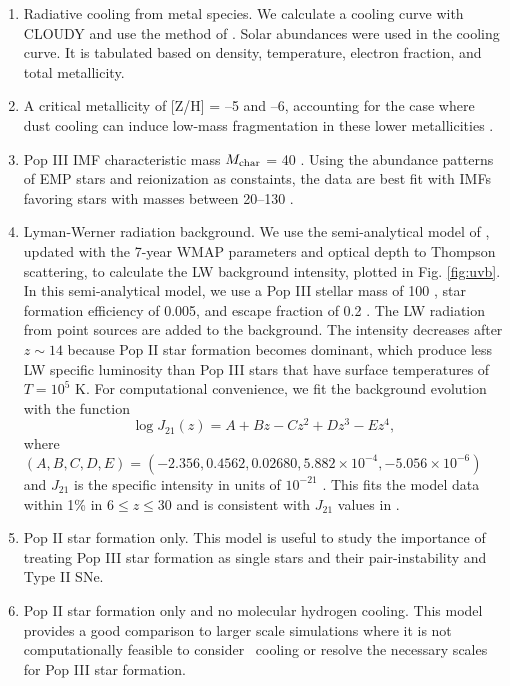 \documentclass[useAMS,usenatbib]{mn2e}
\begin{document}
\begin{enumerate}
\item Radiative cooling from metal species.  We calculate a cooling
  curve with CLOUDY \citep{CLOUDY} and use the method of
  \citep{2008MNRAS.385.1443S}.  Solar abundances were used in the
  cooling curve.  It is tabulated based on density, temperature,
  electron fraction, and total metallicity.
\item A critical metallicity of [Z/H] = --5 and --6, accounting for
  the case where dust cooling can induce low-mass fragmentation in
  these lower metallicities \citep{Omukai05, Schneider06_Frag}.
\item Pop III IMF characteristic mass $M_{\rm char}$ = 40 \Ms.  Using
  the abundance patterns of EMP stars and reionization as constaints,
  the data are best fit with IMFs favoring stars with masses between
  20--130 \Ms \citep{Umeda03, Tumlinson06}.
\item Lyman-Werner radiation background.  We use the semi-analytical
  model of \citet{Wise05}, updated with the 7-year WMAP parameters and
  optical depth to Thompson scattering, to calculate the LW background
  intensity, plotted in Fig. \ref{fig:uvb}.  In this semi-analytical
  model, we use a Pop III stellar mass of 100 \Ms, star formation
  efficiency of 0.005, and escape fraction of 0.2 \citep{Wise09}.  The
  LW radiation from point sources are added to the background.  The
  intensity decreases after $z \sim 14$ because Pop II star formation
  becomes dominant, which produce less LW specific luminosity than Pop
  III stars that have surface temperatures of $T = 10^5$ K.  For
  computational convenience, we fit the background evolution with the
  function
%
  \begin{equation}
    \label{eqn:uvb}
    \log J_{21}(z) = A + Bz - Cz^2 + Dz^3 - Ez^4,
  \end{equation}
%
  where $(A,B,C,D,E) = (-2.356, 0.4562, 0.02680, 5.882 \times 10^{-4},
  -5.056 \times 10^{-6})$ and $J_{21}$ is the specific intensity in
  units of $10^{-21}$ \emis.  This fits the
  model data within 1\% in $6 \le z \le 30$ and is consistent with
  $J_{21}$ values in \citet{Trenti09_SFR}.
\item Pop II star formation only.  This model is useful to study the
  importance of treating Pop III star formation as single stars and
  their pair-instability and Type II SNe.
\item Pop II star formation only and no molecular hydrogen cooling.
  This model provides a good comparison to larger scale simulations
  where it is not computationally feasible to consider \hh~cooling or
  resolve the necessary scales for Pop III star formation.
\end{enumerate}
\end{document}

